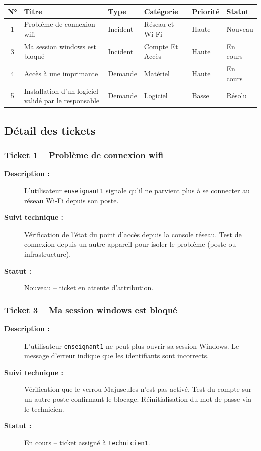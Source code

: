 \documentclass[a4paper,11pt]{article}
\begin{document}
\begin{center}
\small
\begin{tabularx}{\textwidth}{c X l l l l}
\toprule
\textbf{N°} & \textbf{Titre} & \textbf{Type} & \textbf{Catégorie} & \textbf{Priorité} & \textbf{Statut} \\
\midrule
1 & Problème de connexion wifi & Incident & Réseau et Wi-Fi & Haute & Nouveau \\
3 & Ma session windows est bloqué & Incident & Compte Et Accès & Haute & En cours \\
4 & Accès à une imprimante & Demande & Matériel & Haute & En cours \\
5 & Installation d'un logiciel validé par le responsable & Demande & Logiciel & Basse & Résolu \\
\bottomrule
\end{tabularx}
\end{center}

\subsection{Détail des tickets}

\subsubsection*{Ticket 1 -- Problème de connexion wifi}
\begin{description}
    \item[\textbf{Description :}] L'utilisateur \texttt{enseignant1} signale qu'il ne parvient plus à se connecter au réseau Wi-Fi depuis son poste.
    \item[\textbf{Suivi technique :}] Vérification de l'état du point d'accès depuis la console réseau. Test de connexion depuis un autre appareil pour isoler le problème (poste ou infrastructure).
    \item[\textbf{Statut :}] Nouveau -- ticket en attente d'attribution.
\end{description}

\subsubsection*{Ticket 3 -- Ma session windows est bloqué}
\begin{description}
    \item[\textbf{Description :}] L'utilisateur \texttt{enseignant1} ne peut plus ouvrir sa session Windows. Le message d'erreur indique que les identifiants sont incorrects.
    \item[\textbf{Suivi technique :}] Vérification que le verrou Majuscules n'est pas activé. Test du compte sur un autre poste confirmant le blocage. Réinitialisation du mot de passe via le technicien.
    \item[\textbf{Statut :}] En cours -- ticket assigné à \texttt{technicien1}.
\end{description}
\end{document}
